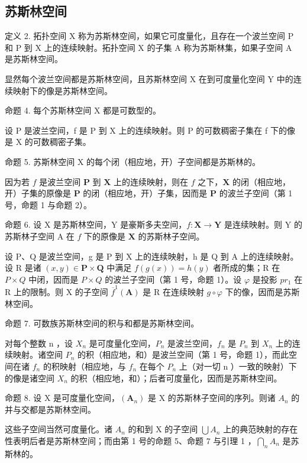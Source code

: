 \subsection{苏斯林空间}

定义 2. 拓扑空间 X 称为苏斯林空间，如果它可度量化，且存在一个波兰空间 P 和 P 到 X 上的连续映射。拓扑空间 X 的子集 A 称为苏斯林集，如果子空间 A 是苏斯林空间。

显然每个波兰空间都是苏斯林空间，且苏斯林空间 X 在到可度量化空间 Y 中的连续映射下的像是苏斯林空间。

命题 4. 每个苏斯林空间 X 都是可数型的。

设 P 是波兰空间，f 是 P 到 X 上的连续映射。则 P 的可数稠密子集在 f 下的像是 X 的可数稠密子集。

命题 5. 苏斯林空间 X 的每个闭（相应地，开）子空间都是苏斯林的。

因为若 \(f\) 是波兰空间 \(\mathbf{P}\) 到 \(\mathbf{X}\) 上的连续映射，则在 \(f\) 之下，\(\mathbf{X}\) 的闭（相应地，开）子集的原像是 \(\mathbf{P}\) 的闭（相应地，开）子集，因而是 \(\mathbf{P}\) 的波兰子空间（第 1 号，命题 1 与命题 2）。

命题 6. 设 X 是苏斯林空间，Y 是豪斯多夫空间，\(f: \mathbf{X} \to \mathbf{Y}\) 是连续映射。则 Y 的苏斯林子空间 A 在 \(f\) 下的原像是 \(\mathbf{X}\) 的苏斯林子空间。

设 P、Q 是波兰空间，g 是 P 到 X 上的连续映射，h 是 Q 到 A 上的连续映射。设 R 是诸 \((x,y)\in\mathbf{P}\times\mathbf{Q}\) 中满足 \(f(g(x))=h(y)\) 者所成的集；R 在 \(P\times Q\) 中闭，因而是 \(P\times Q\) 的波兰子空间（第 1 号，命题 1）。设 \(\varphi\) 是投影 \(pr_{1}\) 在 R 上的限制。则 X 的子空间 \(\overline{f}^{1}(\mathbf{A})\) 是 R 在连续映射 \(g\circ\varphi\) 下的像，因而是苏斯林空间。

命题 7. 可数族苏斯林空间的积与和都是苏斯林空间。

对每个整数 n ，设 \(X_{n}\) 是可度量化空间，\(P_{n}\) 是波兰空间，\(f_{n}\) 是 \(P_{n}\) 到 \(X_{n}\) 上的连续映射。诸空间 \(P_{n}\) 的积（相应地，和）是波兰空间（第 1 号，命题 1），而此空间在诸 \(f_{n}\) 的积映射（相应地，与 \(f_{n}\) 在每个 \(P_{n}\) 上（对一切 n ）一致的映射）下的像是诸空间 \(X_{n}\) 的积（相应地，和）；后者可度量化，因而是苏斯林空间。

命题 8. 设 X 是可度量化空间，\((\mathbf{A}_{n})\) 是 X 的苏斯林子空间的序列。则诸 \(A_{n}\) 的并与交都是苏斯林空间。

这些子空间当然可度量化。诸 \(A_{n}\) 的和到 X 的子空间 \(\bigcup A_{n}\) 上的典范映射的存在性表明后者是苏斯林空间；而由第 1 号的命题 5、命题 7 与引理 1 ，\(\bigcap_{n} A_{n}\) 是苏斯林的。

